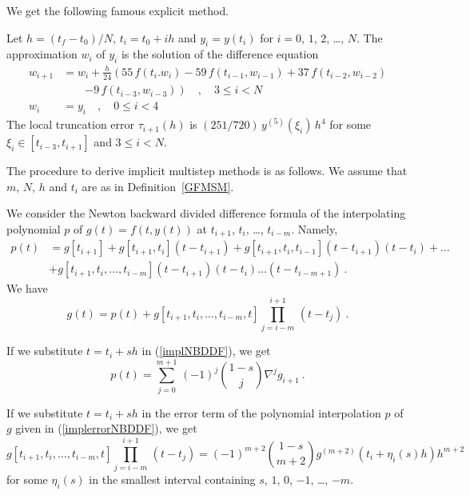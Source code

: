 We get the following famous explicit method.

\begin{defn}
Let $h=(t_f-t_0)/N$, $t_i=t_0+ih$ and $y_i = y(t_i)$ for $i=0$,
$1$, $2$, \ldots, $N$.  The approximation $w_i$ of $y_i$ is the
solution of the difference equation
\begin{align*}
w_{i+1} & = w_i + \frac{h}{24} \left( 55 \, f(t_i.w_i) - 59 \,
f(t_{i-1},w_{i-1}) + 37\, f(t_{i-2},w_{i-2}) \right. \\
&\qquad \left. - 9 \,f(t_{i-3},w_{i-3}) \right)
\quad, \quad 3 \leq i < N \\
w_i & =y_i \quad, \quad 0\leq i < 4
\end{align*}
The local truncation error $\tau_{i+1}(h)$ is
$(251/720)\,y^{(5)}(\xi_i)\,h^4$ for some
$\xi_i \in [t_{i-3},t_{i+1}]$ and $3 \leq i < N$.
\label{ABFSM}
\end{defn}

The procedure to derive implicit multistep methods is as
follows.  We assume that $m$, $N$, $h$ and $t_i$ are as in
Definition~\ref{GFMSM}.

We consider the Newton backward divided difference formula of the
interpolating polynomial $p$ of $g(t) = f(t,y(t))$ at $t_{i+1}$,
$t_i$, \ldots, $t_{i-m}$.  Namely,
\begin{equation} \label{implNBDDF}
\begin{split}
p(t) & = g[t_{i+1}] + g[t_{i+1},t_i](t-t_{i+1}) +
g[t_{i+1},t_i,t_{i-1}](t-t_{i+1})(t-t_i) + \ldots \\
 &+ g[t_{i+1},t_i,\ldots,t_{i-m}](t-t_{i+1})(t-t_i)\ldots(t-t_{i-m+1}) \ .
\end{split}
\end{equation}
We have
\begin{equation} \label{implerrorNBDDF}
g(t) = p(t) +
g[t_{i+1},t_i,\ldots,t_{i-m},t]\prod_{j=i-m}^{i+1}\,(t-t_j) \ .
\end{equation}

If we substitute $t=t_i + sh$ in (\ref{implNBDDF}), we get
\[
p(t) = \sum_{j=0}^{m+1}\,(-1)^j \binom{1-s}{j}\nabla^j g_{i+1} \ .
\]

If we substitute $t=t_i + sh$ in the error term of the polynomial
interpolation $p$ of $g$ given in (\ref{implerrorNBDDF}), we get
\[
g[t_{i+1},t_i,\ldots,t_{i-m},t]\prod_{j=i-m}^{i+1}\,(t-t_j) =
(-1)^{m+2} \binom{1-s}{m+2} g^{(m+2)}(t_i+\eta_i(s)h) h^{m+2}
\]
for some $\eta_i(s)$ in the smallest interval containing
$s$, $1$, $0$, $-1$, \ldots, $-m$.

